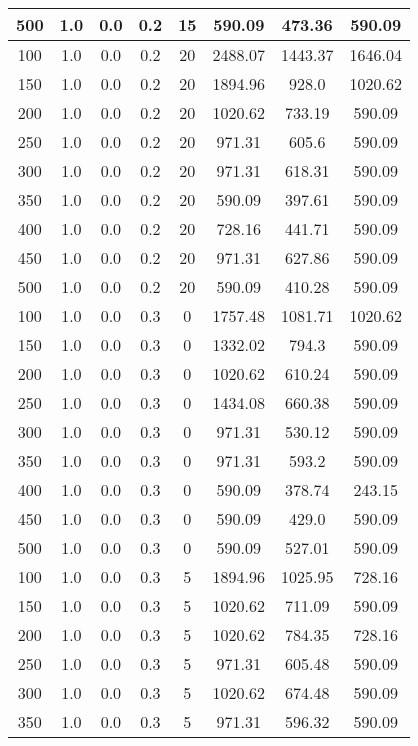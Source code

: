 \documentclass[a4paper, 12pt]{extreport}
\begin{document}
\begin{itemize}
\begin{longtable}{|c|c|c|c|c|c|c|c|}
			500 & 1.0 & 0.0 & 0.2 & 15 & 590.09 & 473.36 & 590.09 \\\hline
			100 & 1.0 & 0.0 & 0.2 & 20 & 2488.07 & 1443.37 & 1646.04 \\\hline
			150 & 1.0 & 0.0 & 0.2 & 20 & 1894.96 & 928.0 & 1020.62 \\\hline
			200 & 1.0 & 0.0 & 0.2 & 20 & 1020.62 & 733.19 & 590.09 \\\hline
			250 & 1.0 & 0.0 & 0.2 & 20 & 971.31 & 605.6 & 590.09 \\\hline
			300 & 1.0 & 0.0 & 0.2 & 20 & 971.31 & 618.31 & 590.09 \\\hline
			350 & 1.0 & 0.0 & 0.2 & 20 & 590.09 & 397.61 & 590.09 \\\hline
			400 & 1.0 & 0.0 & 0.2 & 20 & 728.16 & 441.71 & 590.09 \\\hline
			450 & 1.0 & 0.0 & 0.2 & 20 & 971.31 & 627.86 & 590.09 \\\hline
			500 & 1.0 & 0.0 & 0.2 & 20 & 590.09 & 410.28 & 590.09 \\\hline
			100 & 1.0 & 0.0 & 0.3 & 0 & 1757.48 & 1081.71 & 1020.62 \\\hline
			150 & 1.0 & 0.0 & 0.3 & 0 & 1332.02 & 794.3 & 590.09 \\\hline
			200 & 1.0 & 0.0 & 0.3 & 0 & 1020.62 & 610.24 & 590.09 \\\hline
			250 & 1.0 & 0.0 & 0.3 & 0 & 1434.08 & 660.38 & 590.09 \\\hline
			300 & 1.0 & 0.0 & 0.3 & 0 & 971.31 & 530.12 & 590.09 \\\hline
			350 & 1.0 & 0.0 & 0.3 & 0 & 971.31 & 593.2 & 590.09 \\\hline
			400 & 1.0 & 0.0 & 0.3 & 0 & 590.09 & 378.74 & 243.15 \\\hline
			450 & 1.0 & 0.0 & 0.3 & 0 & 590.09 & 429.0 & 590.09 \\\hline
			500 & 1.0 & 0.0 & 0.3 & 0 & 590.09 & 527.01 & 590.09 \\\hline
			100 & 1.0 & 0.0 & 0.3 & 5 & 1894.96 & 1025.95 & 728.16 \\\hline
			150 & 1.0 & 0.0 & 0.3 & 5 & 1020.62 & 711.09 & 590.09 \\\hline
			200 & 1.0 & 0.0 & 0.3 & 5 & 1020.62 & 784.35 & 728.16 \\\hline
			250 & 1.0 & 0.0 & 0.3 & 5 & 971.31 & 605.48 & 590.09 \\\hline
			300 & 1.0 & 0.0 & 0.3 & 5 & 1020.62 & 674.48 & 590.09 \\\hline
			350 & 1.0 & 0.0 & 0.3 & 5 & 971.31 & 596.32 & 590.09 \\\hline

\end{longtable}
\end{itemize}
\end{document}
